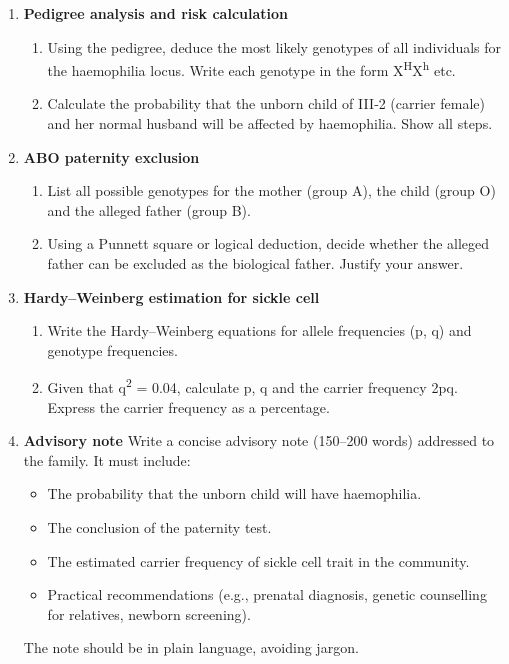 \documentclass[11pt]{article}
\newcommand{\cle}[1]{{\popxbold\color{popdark}#1}}
\newcounter{popsec}
\newcounter{popsub}
\newcommand{\courssub}[1]{%
  \stepcounter{popsub}%
  \par\vspace{9pt}\noindent{\popxbold\fontsize{11.5}{13}\selectfont\color{popink}{\color{poporange}\thepopsec.\thepopsub}\hspace{6pt}#1}\par\nopagebreak\vspace{4pt}
}
\begin{document}
\courssub{Tasks}
\begin{enumerate}
    \item \textbf{Pedigree analysis and risk calculation}
    \begin{enumerate}
        \item Using the pedigree, deduce the most likely genotypes of all individuals for the haemophilia locus. Write each genotype in the form \cle{X\textsuperscript{H}X\textsuperscript{h}} etc.
        \item Calculate the probability that the unborn child of III‑2 (carrier female) and her normal husband will be affected by haemophilia. Show all steps.
    \end{enumerate}
    \item \textbf{ABO paternity exclusion}
    \begin{enumerate}
        \item List all possible genotypes for the mother (group A), the child (group O) and the alleged father (group B).
        \item Using a Punnett square or logical deduction, decide whether the alleged father can be excluded as the biological father. Justify your answer.
    \end{enumerate}
    \item \textbf{Hardy–Weinberg estimation for sickle cell}
    \begin{enumerate}
        \item Write the Hardy–Weinberg equations for allele frequencies (\cle{p}, \cle{q}) and genotype frequencies.
        \item Given that \cle{q\textsuperscript{2} = 0.04}, calculate \cle{p}, \cle{q} and the carrier frequency \cle{2pq}. Express the carrier frequency as a percentage.
    \end{enumerate}
    \item \textbf{Advisory note}
    Write a concise advisory note (150–200 words) addressed to the family. It must include:
    \begin{itemize}
        \item The probability that the unborn child will have haemophilia.
        \item The conclusion of the paternity test.
        \item The estimated carrier frequency of sickle cell trait in the community.
        \item Practical recommendations (e.g., prenatal diagnosis, genetic counselling for relatives, newborn screening).
    \end{itemize}
    The note should be in plain language, avoiding jargon.
\end{enumerate}
\end{document}
